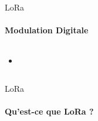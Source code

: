 \begin{frame}{LoRa}
\framesubtitle{Modulation Digitale}

\begin{columns}
\begin{column}{0.5\textwidth}
\begin{itemize}
  \item
\end{itemize}  
\end{column}
\begin{column}{0.5\textwidth}
  
\end{column}
\end{columns}
\end{frame}

\begin{frame}{LoRa}
\framesubtitle{Qu'est-ce que LoRa ?}
\begin{columns}
  \begin{column}{0.6\textwidth}
    

\end{column}
\end{columns}
\end{frame}
